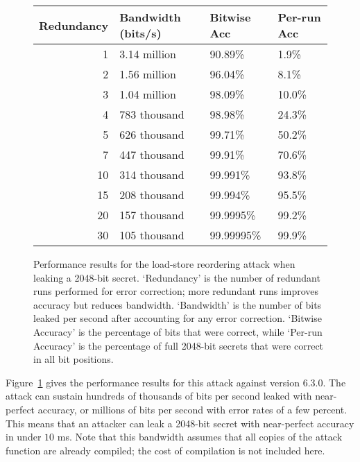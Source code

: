\begin{figure}
  \small
  \begin{tabular}{ r | l | l | l }
    Redundancy & Bandwidth (bits/s) & Bitwise Acc & Per-run Acc \\ \hline
    1          & 3.14 million       & 90.89\%     & 1.9\%       \\
    2          & 1.56 million       & 96.04\%     & 8.1\%       \\
    3          & 1.04 million       & 98.09\%     & 10.0\%      \\
    4          & 783 thousand       & 98.98\%     & 24.3\%      \\
    5          & 626 thousand       & 99.71\%     & 50.2\%      \\
    7          & 447 thousand       & 99.91\%     & 70.6\%      \\
    10         & 314 thousand       & 99.991\%    & 93.8\%      \\
    15         & 208 thousand       & 99.994\%    & 95.5\%      \\
    20         & 157 thousand       & 99.9995\%   & 99.2\%      \\
    30         & 105 thousand       & 99.99995\%  & 99.9\%      \\
  \end{tabular}
  \caption{
    Performance results for the load-store reordering attack when leaking a
    2048-bit secret.
    `Redundancy' is the number of redundant runs performed for error
    correction; more redundant runs improves accuracy but reduces bandwidth.
    `Bandwidth' is the number of bits leaked per second after accounting for
    any error correction.
    `Bitwise Accuracy' is the percentage of bits that were correct, while
    `Per-run Accuracy' is the percentage of full 2048-bit secrets that were
    correct in all bit positions.
  }
  \label{fig:load-store-perf}
\end{figure}

Figure~\ref{fig:load-store-perf} gives the performance results for this attack
against {\GCC} version 6.3.0.
The attack can sustain hundreds of thousands of bits per second leaked with
near-perfect accuracy, or millions of bits per second with error rates of a
few percent.
This means that an attacker can leak a 2048-bit secret with near-perfect
accuracy in under $10$ ms.
Note that this bandwidth assumes that all copies of the attack function are
already compiled; the cost of compilation is not included here.

